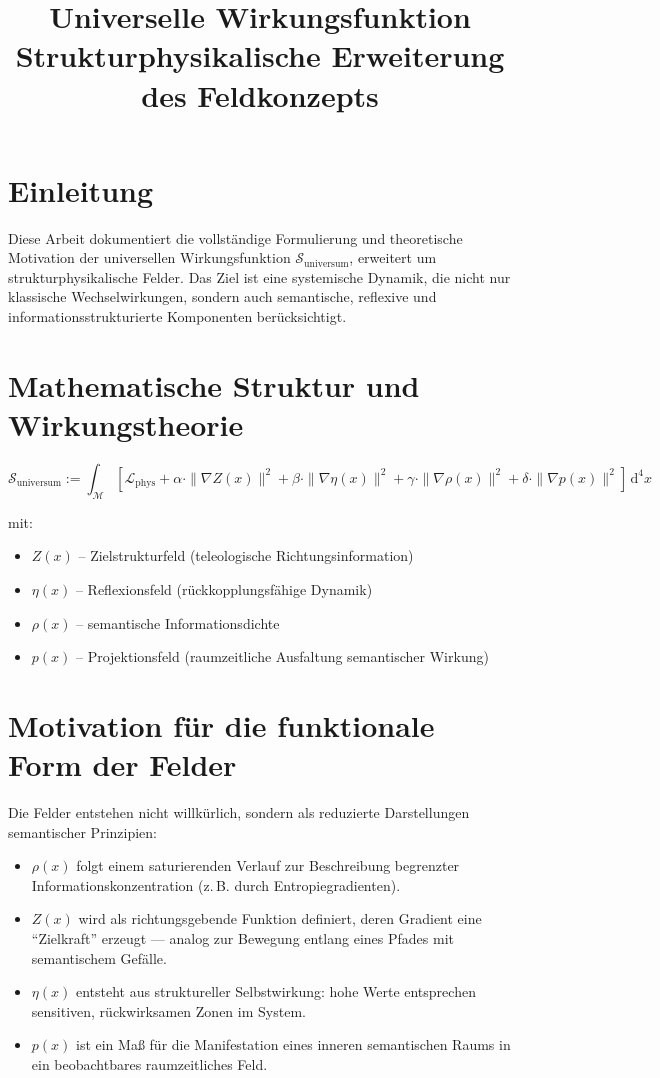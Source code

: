 \documentclass[11pt]{article}
\title{Universelle Wirkungsfunktion \\ Strukturphysikalische Erweiterung des Feldkonzepts}
\author{}
\date{}
\begin{document}
\maketitle

\section*{Einleitung}

Diese Arbeit dokumentiert die vollständige Formulierung und theoretische Motivation der universellen Wirkungsfunktion 
$\mathcal{S}_{\text{universum}}$, erweitert um strukturphysikalische Felder.  
Das Ziel ist eine systemische Dynamik, die nicht nur klassische Wechselwirkungen, sondern auch  
semantische, reflexive und informationsstrukturierte Komponenten berücksichtigt.

\section*{Mathematische Struktur und Wirkungstheorie}

\[
\mathcal{S}_{\text{universum}} := \int_{\mathcal{M}} \left[
\mathcal{L}_{\text{phys}} + 
\alpha \cdot \|\nabla Z(x)\|^2 + 
\beta \cdot \|\nabla \eta(x)\|^2 + 
\gamma \cdot \|\nabla \rho(x)\|^2 +
\delta \cdot \|\nabla p(x)\|^2
\right] \, \mathrm{d}^4x
\]

mit:
\begin{itemize}
  \item $Z(x)$ -- Zielstrukturfeld (teleologische Richtungsinformation)
  \item $\eta(x)$ -- Reflexionsfeld (rückkopplungsfähige Dynamik)
  \item $\rho(x)$ -- semantische Informationsdichte
  \item $p(x)$ -- Projektionsfeld (raumzeitliche Ausfaltung semantischer Wirkung)
\end{itemize}

\section*{Motivation für die funktionale Form der Felder}

Die Felder entstehen nicht willkürlich, sondern als reduzierte Darstellungen semantischer Prinzipien:
\begin{itemize}
  \item $\rho(x)$ folgt einem saturierenden Verlauf zur Beschreibung begrenzter Informationskonzentration (z.\,B. durch Entropiegradienten).
  \item $Z(x)$ wird als richtungsgebende Funktion definiert, deren Gradient eine ``Zielkraft'' erzeugt --- analog zur Bewegung entlang eines Pfades mit semantischem Gefälle.
  \item $\eta(x)$ entsteht aus struktureller Selbstwirkung: hohe Werte entsprechen sensitiven, rückwirksamen Zonen im System.
  \item $p(x)$ ist ein Maß für die Manifestation eines inneren semantischen Raums in ein beobachtbares raumzeitliches Feld.
\end{itemize}
\end{document}
